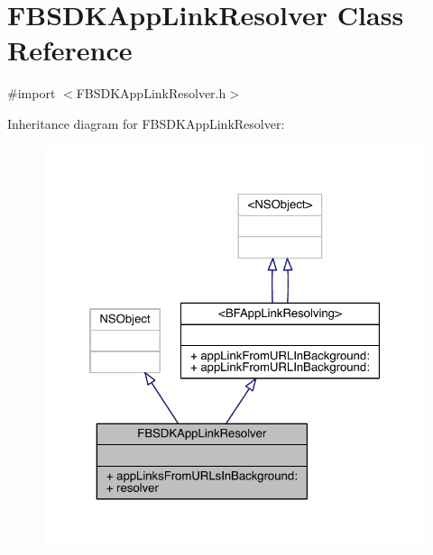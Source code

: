 \hypertarget{interface_f_b_s_d_k_app_link_resolver}{\section{F\-B\-S\-D\-K\-App\-Link\-Resolver Class Reference}
\label{interface_f_b_s_d_k_app_link_resolver}
}


{\ttfamily \#import $<$F\-B\-S\-D\-K\-App\-Link\-Resolver.\-h$>$}



Inheritance diagram for F\-B\-S\-D\-K\-App\-Link\-Resolver\-:
\nopagebreak
\begin{figure}[H]
\begin{center}
\leavevmode
\includegraphics[width=323pt]{interface_f_b_s_d_k_app_link_resolver__inherit__graph}
\end{center}
\end{figure}


